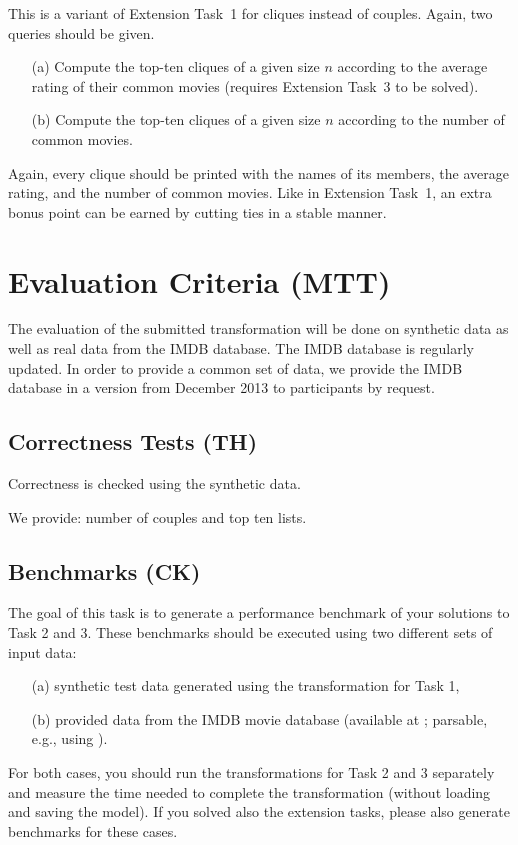 \documentclass[a4paper,11pt]{article}
\begin{document}
This is a variant of Extension Task~1 for cliques instead of couples.  Again,
two queries should be given.

\begin{enumerate}
\item[(a)] Compute the top-ten cliques of a given size \(n\) according to the
  average rating of their common movies (requires Extension Task~3 to be
  solved).
\item[(b)] Compute the top-ten cliques of a given size \(n\) according to the
  number of common movies.
\end{enumerate}

Again, every clique should be printed with the names of its members, the
average rating, and the number of common movies.  Like in Extension Task~1, an
extra bonus point can be earned by cutting ties in a stable manner.


\section{Evaluation Criteria (MTT)}\label{sec-eval}

The evaluation of the submitted transformation will be done on
synthetic data as well as real data from the IMDB database. The IMDB
database is regularly updated. In order to provide a common set of
data, we provide the IMDB database in a version from December 2013 to
participants by request. 

\subsection{Correctness Tests (TH)}

Correctness is checked using the synthetic data.

We provide: number of couples and top ten lists.

\subsection{Benchmarks (CK)}

The goal of this task is to generate a performance benchmark
of your solutions to Task 2 and 3. These benchmarks should be
executed using two different sets of input data:
\begin{enumerate}
\item[(a)] synthetic test data generated using the transformation for Task 1, 
\item[(b)] provided data from the IMDB movie database (available at \cite{IMDBDATA}; parsable, e.g., using \cite{IMDB2EMF}).
\end{enumerate}
For both cases, you should run the transformations for Task 2 and 3
separately and measure the time needed to complete the transformation 
(without loading and saving the model).
If you solved also the extension tasks, please also generate benchmarks
for these cases.
\end{document}

